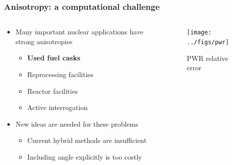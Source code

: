 \documentclass[handout]{beamer}
\renewcommand{\(}{\begin{columns}}
\renewcommand{\)}{\end{columns}}
\newcommand{\<}[1]{\begin{column}{#1}}
\renewcommand{\>}{\end{column}}
\begin{document}
\begin{frame}[fragile]
  \frametitle{Anisotropy: a computational challenge}

	\begin{columns}
  	\begin{column}{0.5\textwidth}
	\begin{itemize}
	\item Many important nuclear applications have strong anisotropies
	 \begin{itemize}
	 \item \textbf{Used fuel casks}
	 \item Reprocessing facilities
	 \item Reactor facilities
	 \item Active interrogation 
	 \end{itemize}
	\pause
	\item New ideas are needed for these problems
	\begin{itemize}
	\item Current hybrid methods are insufficient
	\item Including angle explicitly is too costly	
	\end{itemize}
	\end{itemize}
  	\end{column}
 	\begin{column}{0.5\textwidth}
 	 \begin{center}
 	 \begin{figure}
 	 \texttt{[image: ../figs/pwr]}  
 	 \caption{PWR relative error \cite{Pantelias2013}}
 	 \end{figure}
 	 \end{center}

  	\end{column}
	\end{columns}

\end{frame}
\end{document}
